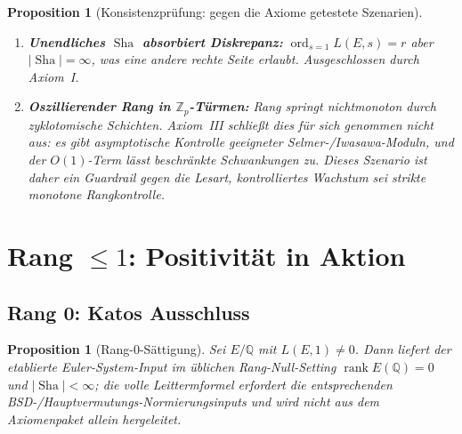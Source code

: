 \documentclass[aps,prd,twocolumn,superscriptaddress,nofootinbib,floatfix]{revtex4-2}
\newtheorem{proposition}[theorem]{Proposition}
\theoremstyle{definition}
\theoremstyle{remark}
\DeclareMathOperator{\ord}{ord}
\DeclareMathOperator{\rank}{rank}
\DeclareMathOperator{\Sha}{Sha}
\begin{document}
\begin{proposition}[Konsistenzprüfung: gegen die Axiome getestete Szenarien]
\begin{enumerate}
\item[\textbf{(E3)}] \textbf{Unendliches $\Sha$ absorbiert Diskrepanz:} $\ord_{s=1} L(E,s) = r$ aber $|\Sha| = \infty$, was eine andere rechte Seite erlaubt. Ausgeschlossen durch Axiom~I.

\item[\textbf{(E4)}] \textbf{Oszillierender Rang in $\mathbb{Z}_p$-Türmen:} Rang springt nichtmonoton durch zyklotomische Schichten. Axiom~III schließt dies für sich genommen nicht aus: es gibt asymptotische Kontrolle geeigneter Selmer-/Iwasawa-Moduln, und der $O(1)$-Term lässt beschränkte Schwankungen zu. Dieses Szenario ist daher ein Guardrail gegen die Lesart, kontrolliertes Wachstum sei strikte monotone Rangkontrolle.
\end{enumerate}
\end{proposition}


\clearpage
\section{\texorpdfstring{Rang $\leq 1$: Positivität in Aktion}{Rang <= 1: Positivität in Aktion}}
\label{sec:rank01}

\subsection{Rang 0: Katos Ausschluss}

\begin{proposition}[Rang-0-Sättigung]
\label{prop:rank0}
Sei $E/\mathbb{Q}$ mit $L(E,1) \neq 0$. Dann liefert der etablierte Euler-System-Input im üblichen Rang-Null-Setting $\rank E(\mathbb{Q}) = 0$ und $|\Sha| < \infty$; die volle Leittermformel erfordert die entsprechenden BSD-/Hauptvermutungs-Normierungsinputs und wird nicht aus dem Axiomenpaket allein hergeleitet.
\end{proposition}
\end{document}
